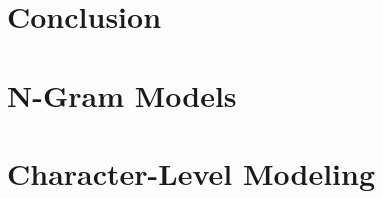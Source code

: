 \documentclass[11pt,letterpaper]{article}
\newcounter{theorem}
\newtheorem{proposition}[theorem]{Proposition}
\begin{document}
%
%
%
%
%




\section{Conclusion}





\appendix




\section{N-Gram Models}


%
%
%



\section{Character-Level Modeling}
\end{document}
